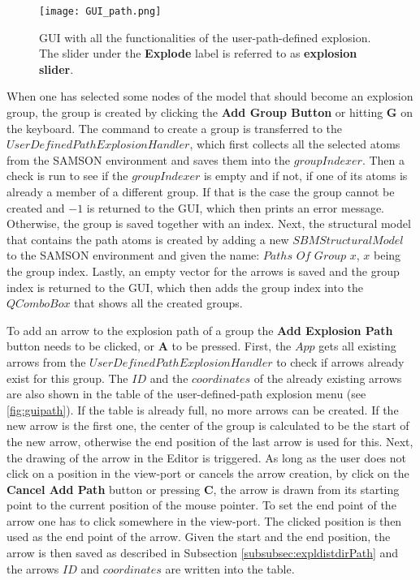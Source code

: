 \documentclass[draft,final]{vutinfth} %
\begin{document}
\begin{figure}
\centering
\texttt{[image: GUI\_path.png]}
\caption{GUI with all the functionalities of the user-path-defined explosion. The slider under the \textbf{Explode} label is referred to as \textbf{explosion slider}.}
\label{fig:guipath}
\end{figure}

\par When one has selected some nodes of the model that should become an explosion group, the group is created by clicking the \textbf{Add Group Button} or hitting \textbf{G} on the keyboard. The command to create a group is transferred to the $UserDefinedPathExplosionHandler$, which first collects all the selected atoms from the SAMSON environment and saves them into the $groupIndexer$. Then a check is run to see if the $groupIndexer$ is empty and if not, if one of its atoms is already a member of a different group. If that is the case the group cannot be created and $-1$ is returned to the GUI, which then prints an error message. Otherwise, the group is saved together with an index. Next, the structural model that contains the path atoms is created by adding a new $SBMStructuralModel$ to the SAMSON environment and given the name: $Paths$ $Of$ $Group$ $x$, $x$ being the group index. Lastly, an empty vector for the arrows is saved and the group index is returned to the GUI, which then adds the group index into the $QComboBox$ that shows all the created groups.

\par To add an arrow to the explosion path of a group the \textbf{Add Explosion Path} button needs to be clicked, or \textbf{A} to be pressed. First, the $App$ gets all existing arrows from the $UserDefinedPathExplosionHandler$ to check if arrows already exist for this group. 
The $ID$ and the $coordinates$ of the already existing arrows are also shown in the table of the user-defined-path explosion menu (see \autoref{fig:guipath}). If the table is already full, no more arrows can be created. If the new arrow is the first one, the center of the group is calculated to be the start of the new arrow, otherwise the end position of the last arrow is used for this. Next, the drawing of the arrow in the Editor is triggered. As long as the user does not click on a position in the view-port or cancels the arrow creation, by click on the \textbf{Cancel Add Path} button or pressing \textbf{C}, the arrow is drawn from its starting point to the current position of the mouse pointer. To set the end point of the arrow one has to click somewhere in the view-port. The clicked position is then used as the end point of the arrow. Given the start and the end position, the arrow is then saved as described in Subsection \ref{subsubsec:expldistdirPath} and the arrows $ID$ and $coordinates$ are written into the table.
\end{document}
